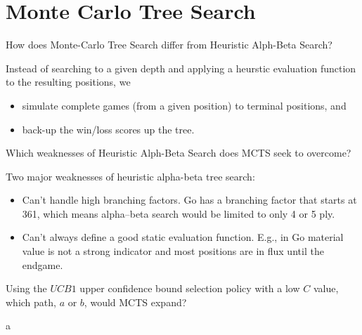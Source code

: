 \section{Monte Carlo Tree Search}

\begin{questions}

\question How does Monte-Carlo Tree Search differ from Heuristic Alph-Beta Search?

\begin{solution}[1.5in]
Instead of searching to a given depth and applying a heurstic evaluation function to the resulting positions, we
\begin{itemize}
\item simulate complete games (from a given position) to terminal positions, and
\item back-up the win/loss scores up the tree.
\end{itemize}
\end{solution}

\question Which weaknesses of Heuristic Alph-Beta Search does MCTS seek to overcome?

\begin{solution}[1.5in]
Two major weaknesses of heuristic alpha-beta tree search:

\begin{itemize}
\item Can't handle high branching factors. Go has a branching factor that starts at 361, which means alpha–beta search would be limited to only 4 or 5 ply.
\item Can't always define a good static evaluation function.  E.g., in Go material value is not a strong indicator and most positions are in flux until the endgame.
\end{itemize}
\end{solution}

\question Using the $UCB1$ upper confidence bound selection policy with a low $C$ value, which path, $a$ or $b$, would MCTS expand?


\begin{solution}[.5in]
a
\end{solution}


\end{questions}


